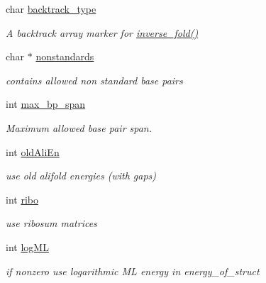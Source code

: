 \begin{DoxyCompactItemize}
char \mbox{\hyperlink{group__model__details_ga83bdb43472a259c71e69fa9f70f420c3}{backtrack\+\_\+type}}
\begin{DoxyCompactList}\small\item\em A backtrack array marker for \mbox{\hyperlink{group__inverse__fold_ga7af026de55d4babad879f2c92559cbbc}{inverse\+\_\+fold()}} \end{DoxyCompactList}\item 
char $\ast$ \mbox{\hyperlink{group__model__details_ga2695d91cc535d09c2eae5c3884e2ec64}{nonstandards}}
\begin{DoxyCompactList}\small\item\em contains allowed non standard base pairs \end{DoxyCompactList}\item 
int \mbox{\hyperlink{group__model__details_ga18df869af0d70101106458fc3f027806}{max\+\_\+bp\+\_\+span}}
\begin{DoxyCompactList}\small\item\em Maximum allowed base pair span. \end{DoxyCompactList}\item 
\mbox{\label{group__model__details_gac408868ba00671cbc7d1d535105af045}} 
int \mbox{\hyperlink{group__model__details_gac408868ba00671cbc7d1d535105af045}{old\+Ali\+En}}
\begin{DoxyCompactList}\small\item\em use old alifold energies (with gaps) \end{DoxyCompactList}\item 
\mbox{\label{group__model__details_ga0656afca1d2853f9ee6591172f5638de}} 
int \mbox{\hyperlink{group__model__details_ga0656afca1d2853f9ee6591172f5638de}{ribo}}
\begin{DoxyCompactList}\small\item\em use ribosum matrices \end{DoxyCompactList}\item 
\mbox{\label{group__model__details_ga80c3c5fd35e7479704cc91d2d0367743}} 
int \mbox{\hyperlink{group__model__details_ga80c3c5fd35e7479704cc91d2d0367743}{log\+ML}}
\begin{DoxyCompactList}\small\item\em if nonzero use logarithmic ML energy in energy\+\_\+of\+\_\+struct \end{DoxyCompactList}\end{DoxyCompactItemize}


